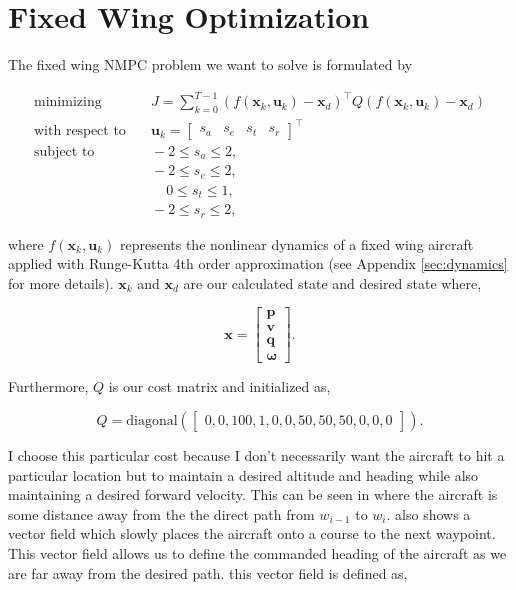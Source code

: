 \documentclass[letterpaper, 10 pt, conference]{ieeeconf}  %
\begin{document}
\section{Fixed Wing Optimization}


The fixed wing NMPC problem we want to solve is formulated by

\begin{equation}
\label{eq:objective}
\begin{aligned}
\text{minimizing} & \quad J= \sum_{k=0}^{T-1} (f(\mathbf{x}_k,\mathbf{u}_k)-\mathbf{x}_{d})^{\top} Q (f(\mathbf{x}_k,\mathbf{u}_k)-\mathbf{x}_{d}) \\
\text{with respect to} & \quad \mathbf{u}_k =\begin{bmatrix}s_{a} & s_{e} & s_{t} & s_{r}\end{bmatrix}^{\top} \\
\text{subject to} & \quad -2 \le s_{a} \le 2, \\
& \quad -2 \le s_{e} \le 2, \\
& \quad \hspace{13pt} 0 \le s_{t} \le 1, \\
& \quad -2 \le s_{r} \le 2,
\end{aligned}
\end{equation}

where $f(\mathbf{x}_k,\mathbf{u}_k)$ represents the nonlinear dynamics of a fixed wing aircraft applied with Runge-Kutta 4th order approximation (see Appendix \ref{sec:dynamics} for more details). $\mathbf{x}_k$ and $\mathbf{x}_{d}$ are our calculated state and desired state where,

\begin{equation}
\label{eq:lqr_current_desired_states}
\mathbf{x}=\begin{bmatrix}\mathbf{p} \\ \mathbf{v} \\ \mathbf{q} \\ \boldsymbol{\omega}\end{bmatrix}.
\end{equation}

Furthermore, $Q$ is our cost matrix and initialized as,

\begin{equation}
Q = \text{diagonal}(\begin{bmatrix}
0,0,100,1,0,0,50,50,50,0,0,0
\end{bmatrix}).
\end{equation}

I choose this particular cost because I don't necessarily want the aircraft to hit a particular location but to maintain a desired altitude and heading while also maintaining a desired forward velocity. This can be seen in  where the aircraft is some distance away from the the direct path from $w_{i-1}$ to $w_i$.  also shows a vector field which slowly places the aircraft onto a course to the next waypoint. This vector field allows us to define the commanded heading of the aircraft as we are far away from the desired path. this vector field is defined as,
\end{document}
